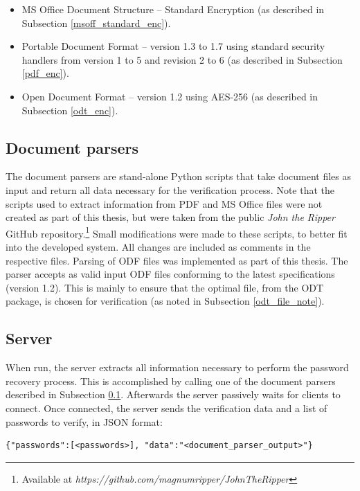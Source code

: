 \documentclass[11pt,oneside]{fithesis2}
\begin{document}
\begin{itemize}
\setlength\itemsep{0.1em}
	\item{MS Office Document Structure -- Standard Encryption (as described in Subsection \ref{msoff_standard_enc}).}
	\item{Portable Document Format --  version 1.3 to 1.7 using standard security handlers from version 1 to 5 and revision 2 to 6 (as described in Subsection \ref{pdf_enc}).}
	\item{Open Document Format – version 1.2 using AES-256 (as described in Subsection \ref{odt_enc}).}
\end{itemize}

\subsection{Document parsers} \label{doc_parsers}

The document parsers are stand-alone Python scripts that take document files as input and return all  data necessary for the verification process. Note that the scripts used to extract information from PDF and MS Office files were not created as part of this thesis, but were taken from the public \textit{John the Ripper} GitHub repository.\footnote{Available at \textit{https://github.com/magnumripper/JohnTheRipper}} Small modifications were made to these scripts, to better fit into the developed system. All changes are included as comments in the respective files. Parsing of ODF files was implemented as part of this thesis. The parser accepts as valid input ODF files conforming to the latest specifications (version 1.2). This is mainly to ensure that the optimal file, from the ODT package, is chosen for verification (as noted in Subsection \ref{odt_file_note}).

\subsection{Server}\label{client-server}

When run, the server extracts all information necessary to perform the password recovery process. This is accomplished by calling one of the document parsers described in Subsection \ref{doc_parsers}. Afterwards the server passively waits for clients to connect. Once connected, the server sends the verification data and a list of passwords to verify, in JSON \cite{rfc7159} format:

\begin{lstlisting} 
{"passwords":[<passwords>], "data":"<document_parser_output>"}
\end{lstlisting}\label{server_message}
\end{document}
